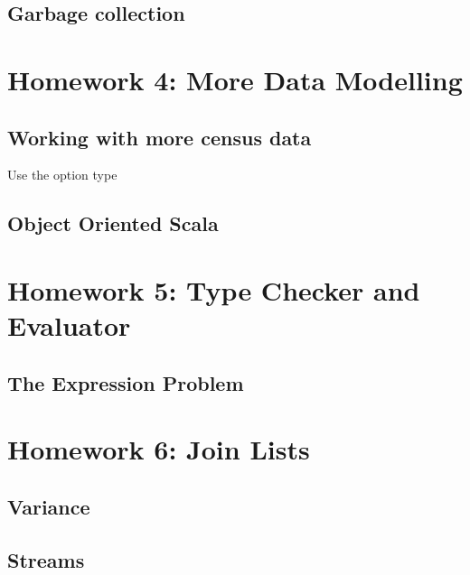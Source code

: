 \documentclass{book}
\begin{document}
\newlecture

\section{Garbage collection}


\chapter{Homework 4: More Data Modelling}

\section{Working with more census data}

Use the option type

\newlecture

\section{Object Oriented Scala}


\chapter{Homework 5: Type Checker and Evaluator}

\newlecture

\section{The Expression Problem}

\newlecture


\chapter{Homework 6: Join Lists}

\newlecture

\section{Variance}

\newlecture

\section{Streams}
\end{document}
